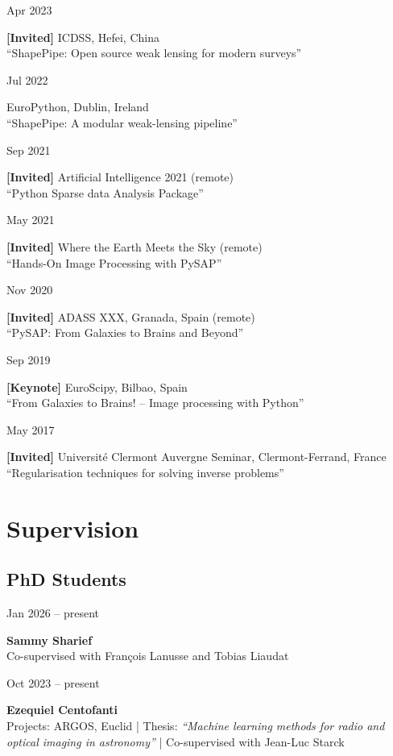 \documentclass[a4paper,10pt]{article}
\newlength{\cvdatew}
\newcommand{\cvline}[2]{%
  \vspace{2pt}%
  \noindent\begin{minipage}[t]{\cvdatew}%
    \raggedright\small\color{muted}#1%
  \end{minipage}%
  \hspace{0.6em}%
  \begin{minipage}[t]{\dimexpr\linewidth-\cvdatew-0.6em\relax}%
    #2%
  \end{minipage}%
  \vspace{2pt}%
}
\begin{document}
\cvline{Apr 2023}{\textbf{[Invited]} ICDSS, Hefei, China\\
  {\small\color{muted}``ShapePipe: Open source weak lensing for modern surveys''}}

\cvline{Jul 2022}{EuroPython, Dublin, Ireland\\
  {\small\color{muted}``ShapePipe: A modular weak-lensing pipeline''}}

\cvline{Sep 2021}{\textbf{[Invited]} Artificial Intelligence 2021 (remote)\\
  {\small\color{muted}``Python Sparse data Analysis Package''}}

\cvline{May 2021}{\textbf{[Invited]} Where the Earth Meets the Sky (remote)\\
  {\small\color{muted}``Hands-On Image Processing with PySAP''}}

\cvline{Nov 2020}{\textbf{[Invited]} ADASS XXX, Granada, Spain (remote)\\
  {\small\color{muted}``PySAP: From Galaxies to Brains and Beyond''}}

\cvline{Sep 2019}{\textbf{[Keynote]} EuroScipy, Bilbao, Spain\\
  {\small\color{muted}``From Galaxies to Brains! -- Image processing with Python''}}

\cvline{May 2017}{\textbf{[Invited]} Universit\'e Clermont Auvergne Seminar, Clermont-Ferrand, France\\
  {\small\color{muted}``Regularisation techniques for solving inverse problems''}}

\section{Supervision}

\subsection{PhD Students}

\cvline{Jan 2026 -- present}{\textbf{Sammy Sharief}\\
  {\small\color{muted}Co-supervised with Fran\c{c}ois Lanusse and Tobias Liaudat}}

\cvline{Oct 2023 -- present}{\textbf{Ezequiel Centofanti}\\
  {\small\color{muted}Projects: ARGOS, Euclid | Thesis: \textit{``Machine learning methods for radio and optical imaging in astronomy''} | Co-supervised with Jean-Luc Starck}}
\end{document}
